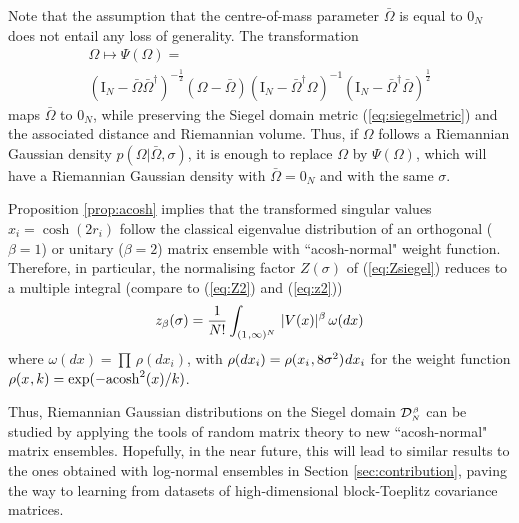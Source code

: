 \documentclass[draftclsnofoot]{IEEEtran}
\begin{document}
Note that the assumption that the centre-of-mass parameter $\bar{\Omega}$ is equal to $\mathrm{0}_{\scriptscriptstyle N}$ does not entail any loss of generality. The transformation~\cite{yannthesis}
\begin{align} \label{eq:moebius1}
\nonumber  \Omega \longmapsto \Psi(\Omega) = \\  (\mathrm{I}_{\scriptscriptstyle N} - \bar{\Omega}\bar{\Omega}^\dagger)^{\scriptscriptstyle -\frac{1}{2}}(\Omega - \bar{\Omega})(\mathrm{I}_{\scriptscriptstyle N} - \bar{\Omega}^\dagger\Omega)^{\scriptscriptstyle -1}
  (\mathrm{I}_{\scriptscriptstyle N} - \bar{\Omega}^\dagger\bar{\Omega})^{\scriptscriptstyle \frac{1}{2}}
\end{align}
maps $\bar{\Omega}$ to $\mathrm{0}_{\scriptscriptstyle N}$, while preserving the Siegel domain metric (\ref{eq:siegelmetric}) and the associated distance and Riemannian volume. Thus, if $\Omega$ follows a Riemannian Gaussian density $p(\Omega|\bar{\Omega},\sigma)$, it is enough to replace $\Omega$ by $\Psi(\Omega)$, which will have a Riemannian Gaussian density with $\bar{\Omega} = \mathrm{0}_{\scriptscriptstyle N}$ and with the same $\sigma$.

Proposition \ref{prop:acosh} implies that the transformed singular values $x_i = \cosh(2r_i)$ follow the classical eigenvalue distribution of an orthogonal ($\beta = 1$) or unitary ($\beta = 2$) matrix ensemble with ``acosh-normal" weight function. Therefore, in particular, the normalising factor $Z(\sigma)$ of  (\ref{eq:Zsiegel}) reduces to a multiple integral (compare to (\ref{eq:Z2}) and (\ref{eq:z2}))
\begin{equation} \label{eq:zsiegel}
z_\beta(\sigma) = \frac{1}{N!}\int_{(1\hspace{0.02cm},\infty)^N}\,|V(x)|^\beta\,\omega(dx)
\end{equation}
where $\omega(dx) = \prod\, \rho(dx_i)$, with $\rho(dx_i) = \rho(x_i\hspace{0.02cm},8\sigma^2)\hspace{0.02cm}dx_i$ for the weight function $\rho(x\hspace{0.02cm},k) = \exp(-\mathrm{acosh}^2(x)/k)$.

Thus, Riemannian Gaussian distributions on the Siegel domain $\mathcal{D}^{\hspace{0.02cm}\scriptscriptstyle \beta}_{\scriptscriptstyle N}$ can be studied by applying the tools of random matrix theory to new ``acosh-normal" matrix ensembles. Hopefully, in the near future, this will lead to similar results to the ones obtained with log-normal ensembles in Section \ref{sec:contribution}, paving the way to learning from datasets of high-dimensional block-Toeplitz covariance matrices. 
\end{document}
